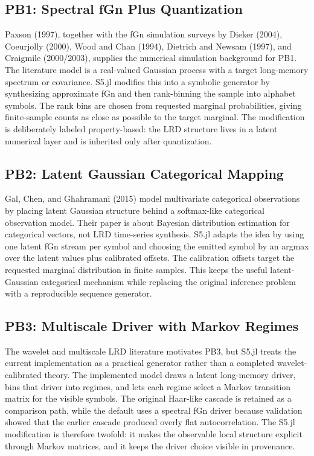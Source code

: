 \documentclass[11pt]{article}
\begin{document}
\subsection{PB1: Spectral fGn Plus Quantization}

Paxson (1997), together with the fGn simulation surveys by Dieker (2004),
Coeurjolly (2000), Wood and Chan (1994), Dietrich and Newsam (1997), and
Craigmile (2000/2003), supplies the numerical simulation background for PB1.
The literature model is a real-valued Gaussian process with a target
long-memory spectrum or covariance. S5.jl modifies this into a symbolic
generator by synthesizing approximate fGn and then rank-binning the sample into
alphabet symbols. The rank bins are chosen from requested marginal
probabilities, giving finite-sample counts as close as possible to the target
marginal. The modification is deliberately labeled property-based: the LRD
structure lives in a latent numerical layer and is inherited only after
quantization.

\subsection{PB2: Latent Gaussian Categorical Mapping}

Gal, Chen, and Ghahramani (2015) model multivariate categorical observations by
placing latent Gaussian structure behind a softmax-like categorical
observation model. Their paper is about Bayesian distribution estimation for
categorical vectors, not LRD time-series synthesis. S5.jl adapts the idea by
using one latent fGn stream per symbol and choosing the emitted symbol by an
argmax over the latent values plus calibrated offsets. The calibration offsets
target the requested marginal distribution in finite samples. This keeps the
useful latent-Gaussian categorical mechanism while replacing the original
inference problem with a reproducible sequence generator.

\subsection{PB3: Multiscale Driver with Markov Regimes}

The wavelet and multiscale LRD literature motivates PB3, but S5.jl treats the
current implementation as a practical generator rather than a completed
wavelet-calibrated theory. The implemented model draws a latent long-memory
driver, bins that driver into regimes, and lets each regime select a Markov
transition matrix for the visible symbols. The original Haar-like cascade is
retained as a comparison path, while the default uses a spectral fGn driver
because validation showed that the earlier cascade produced overly flat
autocorrelation. The S5.jl modification is therefore twofold: it makes the
observable local structure explicit through Markov matrices, and it keeps the
driver choice visible in provenance.
\end{document}
